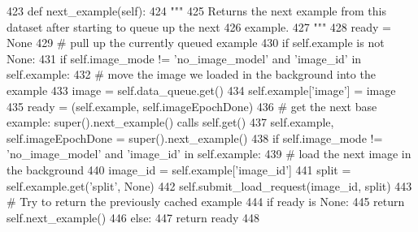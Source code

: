 \begin{DoxyCode}
423     \textcolor{keyword}{def }next\_example(self):
424         \textcolor{stringliteral}{"""}
425 \textcolor{stringliteral}{        Returns the next example from this dataset after starting to queue up the next}
426 \textcolor{stringliteral}{        example.}
427 \textcolor{stringliteral}{        """}
428         ready = \textcolor{keywordtype}{None}
429         \textcolor{comment}{# pull up the currently queued example}
430         \textcolor{keywordflow}{if} self.example \textcolor{keywordflow}{is} \textcolor{keywordflow}{not} \textcolor{keywordtype}{None}:
431             \textcolor{keywordflow}{if} self.image\_mode != \textcolor{stringliteral}{'no\_image\_model'} \textcolor{keywordflow}{and} \textcolor{stringliteral}{'image\_id'} \textcolor{keywordflow}{in} self.example:
432                 \textcolor{comment}{# move the image we loaded in the background into the example}
433                 image = self.data\_queue.get()
434                 self.example[\textcolor{stringliteral}{'image'}] = image
435             ready = (self.example, self.imageEpochDone)
436         \textcolor{comment}{# get the next base example: super().next\_example() calls self.get()}
437         self.example, self.imageEpochDone = super().next\_example()
438         \textcolor{keywordflow}{if} self.image\_mode != \textcolor{stringliteral}{'no\_image\_model'} \textcolor{keywordflow}{and} \textcolor{stringliteral}{'image\_id'} \textcolor{keywordflow}{in} self.example:
439             \textcolor{comment}{# load the next image in the background}
440             image\_id = self.example[\textcolor{stringliteral}{'image\_id'}]
441             split = self.example.get(\textcolor{stringliteral}{'split'}, \textcolor{keywordtype}{None})
442             self.submit\_load\_request(image\_id, split)
443         \textcolor{comment}{# Try to return the previously cached example}
444         \textcolor{keywordflow}{if} ready \textcolor{keywordflow}{is} \textcolor{keywordtype}{None}:
445             \textcolor{keywordflow}{return} self.next\_example()
446         \textcolor{keywordflow}{else}:
447             \textcolor{keywordflow}{return} ready
448 
\end{DoxyCode}
\mbox{\label{classparlai_1_1tasks_1_1coco__caption_1_1agents_1_1DefaultTeacher_a688ac5a25bb6bb79b57550ecdec0eab1}} 
